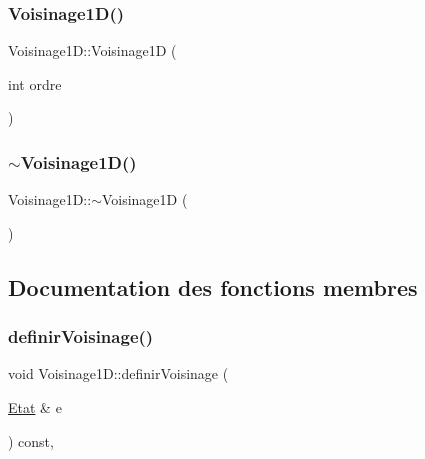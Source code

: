 \subsubsection{\texorpdfstring{Voisinage1\+D()}{Voisinage1D()}}
{\footnotesize\ttfamily Voisinage1\+D\+::\+Voisinage1D (\begin{DoxyParamCaption}\item[{int}]{ordre }\end{DoxyParamCaption})\hspace{0.3cm}{\ttfamily [inline]}}

\mbox{\label{class_voisinage1_d_acb729fcae98b25a67d33098ef4a38260}} 
\subsubsection{\texorpdfstring{$\sim$\+Voisinage1\+D()}{~Voisinage1D()}}
{\footnotesize\ttfamily Voisinage1\+D\+::$\sim$\+Voisinage1D (\begin{DoxyParamCaption}{ }\end{DoxyParamCaption})\hspace{0.3cm}{\ttfamily [default]}}



\subsection{Documentation des fonctions membres}
\mbox{\label{class_voisinage1_d_afdc267252af9b94fe26f5414d1472265}} 
\subsubsection{\texorpdfstring{definir\+Voisinage()}{definirVoisinage()}}
{\footnotesize\ttfamily void Voisinage1\+D\+::definir\+Voisinage (\begin{DoxyParamCaption}\item[{\mbox{\hyperlink{class_etat}{Etat}} \&}]{e }\end{DoxyParamCaption}) const\hspace{0.3cm}{\ttfamily [final]}, {\ttfamily [virtual]}}



